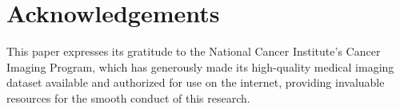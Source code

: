 \documentclass[twocolumn]{article}
\begin{document}
\section*{Acknowledgements}
This paper expresses its gratitude to the National Cancer Institute's Cancer Imaging Program, which has generously made its high-quality medical imaging dataset available and authorized for use on the internet, providing invaluable resources for the smooth conduct of this research.




\end{document}
